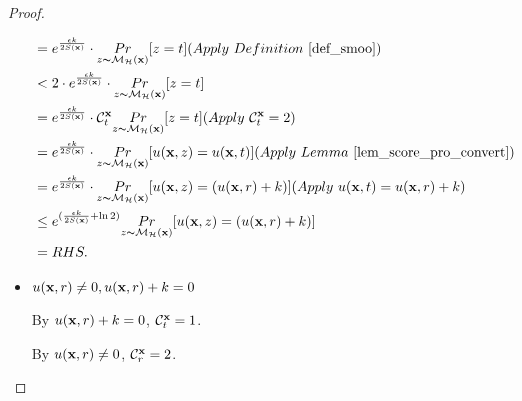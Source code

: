 \documentclass{article}
\begin{document}
\begin{proof}
\begin{itemize}
\begin{equation*}
\begin{split}
        & = e^{\frac{\epsilon k}{2 S(\dataobs)}} \cdot \hexpmechPr{\dataobs}{z = t}       (Apply\ Definition\ \ref{def_smoo})\\
        & < 2 \cdot e^{\frac{\epsilon k}{2 S(\dataobs)}} \cdot \hexpmechPr{\dataobs}{z = t}\\
        & = e^{\frac{\epsilon k}{2 S(\dataobs)}} \cdot \cardinality{\dataobs}{t} \hexpmechPr{\dataobs}{z = t}   (Apply \ \cardinality{\dataobs}{t} = 2)\\
        & = e^{\frac{\epsilon k}{2 S(\dataobs)}} \cdot \hexpmechPr{\dataobs}{\ux{z} = \ux{t}}         (Apply \ Lemma\ \ref{lem_score_pro_convert})\\
        & = e^{\frac{\epsilon k}{2 S(\dataobs)}} \cdot \hexpmechPr{\dataobs}{\ux{z} = (\ux{r} + k)}   (Apply \ \ux{t} = \ux{r} + k)\\
        & \leq e^{(\frac{\epsilon k}{2 S(\dataobs)} + \ln 2)} \hexpmechPr{\dataobs}{\ux{z} = ( \ux{r} + k)}\\
        & = RHS.
        \end{split}
        \end{equation*}

  \item {\boldmath$u(\textbf{x}, {r}) \neq 0, u(\textbf{x}, {r}) + k = 0$} 

      By $u(\textbf{x}, {r}) + k = 0$, $\mathcal{C}^{\textbf{x}}_{t} = 1$. 

      By $u(\textbf{x}, {r}) \neq 0$, $\mathcal{C}^{\textbf{x}}_{r} = 2$.  


\end{itemize}
\end{proof}
\end{document}
